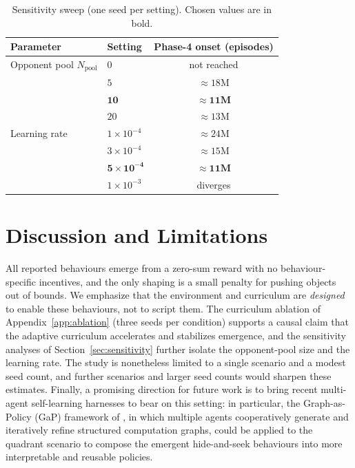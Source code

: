 \documentclass{article}
\begin{document}
\begin{table}[H]
  \centering
  \caption{Sensitivity sweep (one seed per setting). Chosen values are
  in bold.}
  \label{tab:sens}
  \begin{tabular}{llc}
    \toprule
    Parameter & Setting & Phase-4 onset (episodes) \\
    \midrule
    Opponent pool $N_{\text{pool}}$ & $0$           & not reached \\
                                    & $5$           & $\approx18$M \\
                                    & $\mathbf{10}$ & $\mathbf{\approx11\text{M}}$ \\
                                    & $20$          & $\approx13$M \\
    \midrule
    Learning rate & $1\times10^{-4}$          & $\approx24$M \\
                  & $3\times10^{-4}$          & $\approx15$M \\
                  & $\mathbf{5\times10^{-4}}$ & $\mathbf{\approx11\text{M}}$ \\
                  & $1\times10^{-3}$          & diverges \\
    \bottomrule
  \end{tabular}
\end{table}

\section{Discussion and Limitations}
All reported behaviours emerge from a zero-sum reward with no behaviour-specific
incentives, and the only shaping is a small penalty for pushing objects out of
bounds. We emphasize that the environment and curriculum are \emph{designed} to
enable these behaviours, not to script them. The curriculum ablation of
Appendix~\ref{app:ablation} (three seeds per condition) supports a causal claim
that the adaptive curriculum accelerates and stabilizes emergence, and the
sensitivity analyses of Section~\ref{sec:sensitivity} further isolate the
opponent-pool size and the learning rate. The study is nonetheless limited to a
single scenario and a modest seed count, and further scenarios and larger seed
counts would sharpen these estimates. Finally, a promising direction for future
work is to bring recent multi-agent self-learning harnesses to bear on this
setting: in particular, the Graph-as-Policy (GaP) framework of
\citet{chen2026gap}, in which multiple agents cooperatively generate and
iteratively refine structured computation graphs, could be applied to the quadrant
scenario to compose the emergent hide-and-seek behaviours into more interpretable
and reusable policies.
\end{document}

